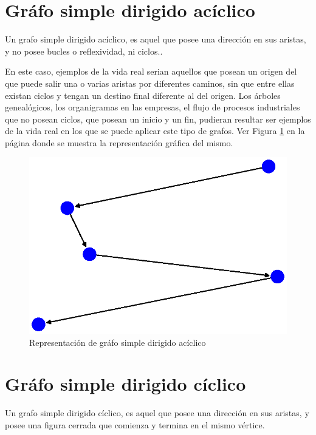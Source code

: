 \documentclass{article}
\begin{document}
\section{Gráfo simple dirigido acíclico}

Un grafo simple dirigido acíclico, es aquel que posee una dirección en sus aristas, y no posee bucles o reflexividad, ni ciclos.\cite{Elisa}.
 
En este caso, ejemplos de la vida real serian aquellos que posean un origen del que puede salir una o varias aristas por diferentes caminos, sin que entre ellas existan ciclos y tengan un destino final diferente al del origen. Los árboles genealógicos, los organigramas en las empresas, el flujo de procesos industriales que no posean ciclos, que posean un inicio y un fin, pudieran resultar ser ejemplos de la vida real en los que se puede aplicar este tipo de grafos. Ver Figura \ref{fig:Fig04} en la página \pageref{fig:Fig04} donde se muestra la representación gráfica del mismo.




\begin{figure}
    \centering
    \includegraphics[scale=0.4]{imagenes/Fig04.eps}
    \caption{Representación de gráfo simple dirigido acíclico}
    \label{fig:Fig04}
\end{figure}


\section{Gráfo simple dirigido cíclico}

Un grafo simple dirigido cíclico, es aquel que posee una dirección en sus aristas, y posee una figura cerrada que comienza y  termina en el mismo vértice.
\end{document}
